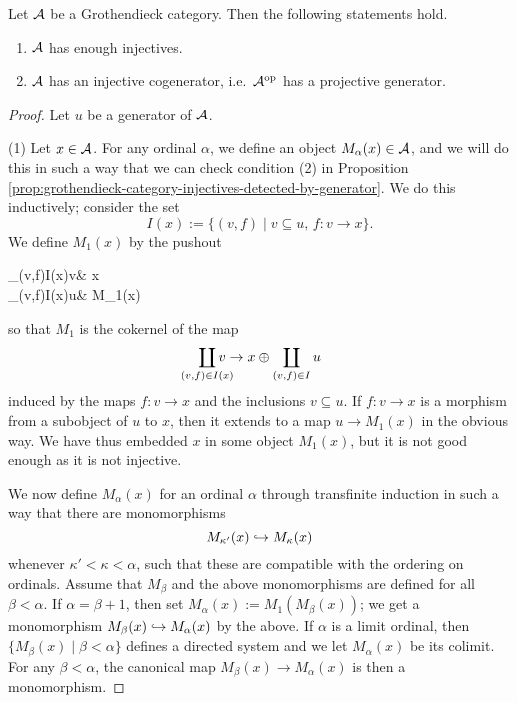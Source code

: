 \begin{theorem}
	Let \(\mathcal{A}\) be a Grothendieck category. Then the following statements hold.
	\begin{enumerate}[label=(\arabic*)]
	\item \(\mathcal{A}\)	has enough injectives.
	\item \(\mathcal{A}\) has an injective cogenerator, i.e.\ \(\mathcal{A}^{\mathrm{op}}\) has a projective generator.
	\end{enumerate}
\end{theorem}
\begin{proof}
Let \(u\) be a generator of \(\mathcal{A}\).

(1) Let \(x\in\mathcal{A}\). For any ordinal \(\alpha\), we define an object \(M_\alpha(x)\in\mathcal{A}\), and we will do this in such a way that we can check condition (2) in
Proposition \ref{prop:grothendieck-category-injectives-detected-by-generator}. We do this inductively; consider the set
\[ I(x) := \{ (v,f)\mid v\subseteq u,\, f\!:v\to x \}. \]
We define \(M_1(x)\) by the pushout
\begin{diagram*}
	\coprod_{(v,f)\in I(x)}v\ar[r]\ar[d,hook] & x \\
	\coprod_{(v,f)\in I(x)}u\ar[r,dashed] & M_1(x)
\end{diagram*}
so that \(M_1\) is the cokernel of the map
\[ \coprod_{\mathclap{(v,f)\in I(x)}}v \to x\oplus \coprod_{(v,f)\in I}u \]
induced by the maps \(f\!:v\to x\) and the inclusions \(v\subseteq u\). If \(f\!:v\to x\) is a morphism from a subobject of \(u\) to \(x\), then it extends to a map \(u\to M_1(x)\) in the obvious way.
We have thus embedded \(x\) in some object \(M_1(x)\), but it is not good enough as it is not injective.

We now define \(M_\alpha(x)\) for an ordinal \(\alpha\) through transfinite induction in such a way that there are monomorphisms
\[ M_{\kappa'}(x) \hookrightarrow M_{\kappa}(x) \]
whenever \(\kappa' < \kappa < \alpha\), such that these are compatible with the ordering on ordinals. Assume that \(M_\beta\) and the above monomorphisms are defined for all \(\beta < \alpha\). If \(\alpha = \beta+1\),
then set \(M_\alpha(x) := M_1(M_\beta(x))\); we get a monomorphism \(M_\beta(x)\hookrightarrow M_{\alpha}(x)\) by the above. If \(\alpha\) is a limit ordinal, then \(\{ M_{\beta}(x)\mid \beta < \alpha \}\) defines a directed system
and we let \(M_\alpha(x)\) be its colimit. For any \(\beta < \alpha\), the canonical map \(M_\beta(x)\to M_\alpha(x)\) is then a monomorphism.


\end{proof}
